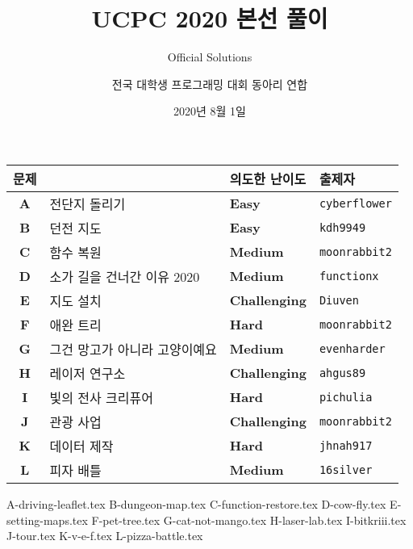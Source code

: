 
\usetikzlibrary{arrows.meta,matrix,decorations.pathreplacing}

\title{UCPC 2020 본선 풀이}
\subtitle{Official Solutions}
\author{전국 대학생 프로그래밍 대회 동아리 연합}
\date{2020년 8월 1일}


    \setcounter{framenumber}{-1}
    \frame{\titlepage}
        
    \begin{frame} %
        \begin{center}
            \begin{tabular}{cl|l|l}
                \hline
                문제 & & 의도한 난이도 & 출제자 \\
                \hline
                \hline
                \textbf{A} & 전단지 돌리기& \textbf{\color{acgold}Easy} & \texttt{cyberflower} \\
                \textbf{B} & 던전 지도 & \textbf{\color{acgold}Easy} & \texttt{kdh9949} \\
                \textbf{C} & 함수 복원 & \textbf{\color{acplatinum}Medium} & \texttt{moonrabbit2} \\
                \textbf{D} & 소가 길을 건너간 이유 2020 & \textbf{\color{acplatinum}Medium} & \texttt{functionx} \\
                \textbf{E} & 지도 설치 & \textbf{\color{acdiamond}Challenging} & \texttt{Diuven} \\
                \textbf{F} & 애완 트리 & \textbf{\color{acdiamond}Hard} & \texttt{moonrabbit2} \\
                \textbf{G} & 그건 망고가 아니라 고양이예요 & \textbf{\color{acplatinum}Medium} & \texttt{evenharder} \\
                \textbf{H} & 레이저 연구소 & \textbf{\color{acdiamond}Challenging} & \texttt{ahgus89} \\
                \textbf{I} & 빛의 전사 크리퓨어 & \textbf{\color{acdiamond}Hard} & \texttt{pichulia} \\
                \textbf{J} & 관광 사업 & \textbf{\color{acruby}Challenging} & \texttt{moonrabbit2} \\
                \textbf{K} & 데이터 제작 & \textbf{\color{acdiamond}Hard} & \texttt{jhnah917} \\
                \textbf{L} & 피자 배틀 & \textbf{\color{acplatinum}Medium} & \texttt{16silver} \\
                \hline
            \end{tabular}
        \end{center}
    \end{frame}
    {A-driving-leaflet.tex}
    {B-dungeon-map.tex}
    {C-function-restore.tex}
    {D-cow-fly.tex}
    {E-setting-maps.tex}
    {F-pet-tree.tex}
    {G-cat-not-mango.tex}
    {H-laser-lab.tex}
    {I-bitkriii.tex}
    {J-tour.tex}
    {K-v-e-f.tex}
    {L-pizza-battle.tex}


